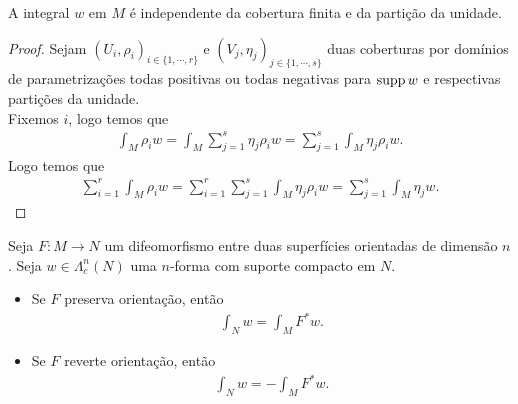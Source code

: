 \begin{proposition}
  A integral $w$ em $M$ é independente da cobertura finita e da partição da unidade. 
\end{proposition}
\begin{proof} 
  Sejam $(U_i,\rho_i)_{i\in\{1,\cdots,r\}}$ e $(V_j,\eta_j)_{j\in\{1,\cdots,s\}}$ duas coberturas por domínios de parametrizações todas positivas ou todas negativas para $\operatorname{supp} w$ e respectivas partições da unidade.\\
  Fixemos $i$, logo temos que
  \begin{align*}
    \int_{M}\rho_i w=\int_{M}\sum_{j=1}^{s}\eta_j\rho_i w=\sum_{j=1}^{s}\int_{M}\eta_j\rho_i w.
  \end{align*}
  Logo temos que
  \begin{align*}
    \sum_{i=1}^{r}\int_{M}\rho_i w=\sum_{i=1}^{r}\sum_{j=1}^{s}\int_{M}\eta_j\rho_i w=\sum_{j=1}^{s}\int_{M}\eta_j w.
  \end{align*}
\end{proof}
\begin{proposition}\label{prop:difeomorfismo-superficies}
  Seja $F:M\to N$ um difeomorfismo entre duas superfícies orientadas de dimensão $n$. Seja $w\in\Lambda^{n}_c(N)$ uma $n$-forma com suporte compacto em $N$.
  \begin{itemize}
    \item Se $F$ preserva orientação, então
      \begin{align*}
        \int_{N}w=\int_{M}F^{\ast}w.
      \end{align*}
     \item Se $F$ reverte orientação, então
      \begin{align*}
        \int_{N}w=-\int_{M}F^{\ast}w.
      \end{align*}
 \end{itemize}
\end{proposition}
